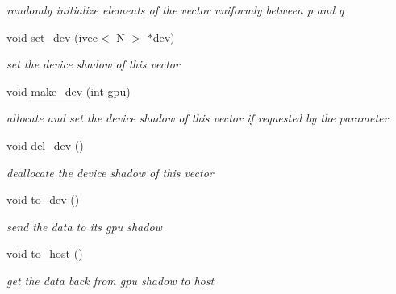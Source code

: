 \begin{DoxyCompactItemize}
\begin{DoxyCompactList}\small\item\em randomly initialize elements of the vector uniformly between p and q \end{DoxyCompactList}\item 
void \hyperlink{structivec_abe2b4ca3bb19444a5a915676aa333008}{set\+\_\+dev} (\hyperlink{structivec}{ivec}$<$ N $>$ $\ast$\hyperlink{structivec_ac50ca2c5bec8b1fd9e84fb8cba681ed6}{dev})
\begin{DoxyCompactList}\small\item\em set the device shadow of this vector \end{DoxyCompactList}\item 
void \hyperlink{structivec_a70cade2ab506db00fa0df8a66092e646}{make\+\_\+dev} (int gpu)
\begin{DoxyCompactList}\small\item\em allocate and set the device shadow of this vector if requested by the parameter \end{DoxyCompactList}\item 
\mbox{\label{structivec_a1ec4ea7f160e1583c777e4a6d31bd128}} 
void \hyperlink{structivec_a1ec4ea7f160e1583c777e4a6d31bd128}{del\+\_\+dev} ()
\begin{DoxyCompactList}\small\item\em deallocate the device shadow of this vector \end{DoxyCompactList}\item 
\mbox{\label{structivec_a8ba432f4fde0ff661de285625fca5719}} 
void \hyperlink{structivec_a8ba432f4fde0ff661de285625fca5719}{to\+\_\+dev} ()
\begin{DoxyCompactList}\small\item\em send the data to its gpu shadow \end{DoxyCompactList}\item 
\mbox{\label{structivec_a6cbc9444fd57cb38373ac6ba8e7d4e87}} 
void \hyperlink{structivec_a6cbc9444fd57cb38373ac6ba8e7d4e87}{to\+\_\+host} ()
\begin{DoxyCompactList}\small\item\em get the data back from gpu shadow to host \end{DoxyCompactList}\end{DoxyCompactItemize}
